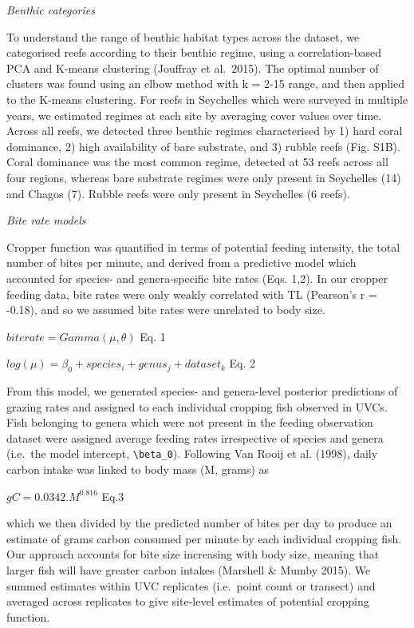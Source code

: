 \documentclass[12pt,]{article}
\begin{document}
\emph{Benthic categories}

To understand the range of benthic habitat types across the dataset, we
categorised reefs according to their benthic regime, using a
correlation-based PCA and K-means clustering (Jouffray et al.~2015). The
optimal number of clusters was found using an elbow method with k = 2-15
range, and then applied to the K-means clustering. For reefs in
Seychelles which were surveyed in multiple years, we estimated regimes
at each site by averaging cover values over time. Across all reefs, we
detected three benthic regimes characterised by 1) hard coral dominance,
2) high availability of bare substrate, and 3) rubble reefs (Fig. S1B).
Coral dominance was the most common regime, detected at 53 reefs across
all four regions, whereas bare substrate regimes were only present in
Seychelles (14) and Chagos (7). Rubble reefs were only present in
Seychelles (6 reefs).

\emph{Bite rate models}

Cropper function was quantified in terms of potential feeding intensity,
the total number of bites per minute, and derived from a predictive
model which accounted for species- and genera-specific bite rates (Eqs.
1,2). In our cropper feeding data, bite rates were only weakly
correlated with TL (Pearson's r = -0.18), and so we assumed bite rates
were unrelated to body size.

\(biterate = Gamma(\mu, \theta)\) \hfill Eq. 1

\(log(\mu) = \beta_0 + species_i + genus_j + dataset_k\) \hfill Eq. 2

From this model, we generated species- and genera-level posterior
predictions of grazing rates and assigned to each individual cropping
fish observed in UVCs. Fish belonging to genera which were not present
in the feeding observation dataset were assigned average feeding rates
irrespective of species and genera (i.e.~the model intercept,
\texttt{\textbackslash{}beta\_0}). Following Van Rooij et al. (1998),
daily carbon intake was linked to body mass (M, grams) as

\(gC = 0.0342.M^{0.816}\) \hfill Eq.3

which we then divided by the predicted number of bites per day to
produce an estimate of grams carbon consumed per minute by each
individual cropping fish. Our approach accounts for bite size increasing
with body size, meaning that larger fish will have greater carbon
intakes (Marshell \& Mumby 2015). We summed estimates within UVC
replicates (i.e.~point count or transect) and averaged across replicates
to give site-level estimates of potential cropping function.
\end{document}
